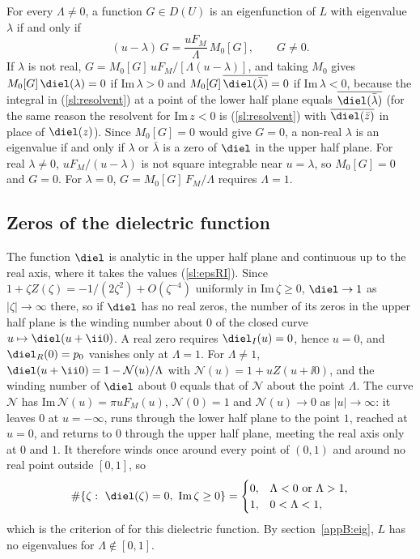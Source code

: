 For every $\Lambda\neq0$, a function $G\in D(U)$ is an eigenfunction of $L$ with eigenvalue $\lambda$ if and only if
\begin{equation*}
  (u-\lambda)\,G=\frac{uF_M}{\Lambda}\,M_0[G],\qquad G\neq0 .
\end{equation*}
If $\lambda$ is not real, $G=M_0[G]\,uF_M/[\Lambda(u-\lambda)]$, and taking $M_0$ gives $M_0[G]\,\diel(\lambda)=0$ if $\mathrm{Im}\,\lambda>0$ and $M_0[G]\,\overline{\diel(\bar\lambda)}=0$ if $\mathrm{Im}\,\lambda<0$, because the integral in (\ref{sl:resolvent}) at a point of the lower half plane equals $\overline{\diel(\bar\lambda)}$ (for the same reason the resolvent for $\mathrm{Im}\,z<0$ is (\ref{sl:resolvent}) with $\overline{\diel(\bar z)}$ in place of $\diel(z)$). Since $M_0[G]=0$ would give $G=0$, a non-real $\lambda$ is an eigenvalue if and only if $\lambda$ or $\bar\lambda$ is a zero of $\diel$ in the upper half plane. For real $\lambda\neq0$, $uF_M/(u-\lambda)$ is not square integrable near $u=\lambda$, so $M_0[G]=0$ and $G=0$. For $\lambda=0$, $G=M_0[G]\,F_M/\Lambda$ requires $\Lambda=1$.

\subsection{Zeros of the dielectric function}\label{appB:penrose}

The function $\diel$ is analytic in the upper half plane and continuous up to the real axis, where it takes the values (\ref{sl:epsRI}). Since $1+\zeta Z(\zeta)=-1/(2\zeta^2)+O(\zeta^{-4})$ uniformly in $\mathrm{Im}\,\zeta\ge0$, $\diel\to1$ as $|\zeta|\to\infty$ there, so if $\diel$ has no real zeros, the number of its zeros in the upper half plane is the winding number about $0$ of the closed curve $u\mapsto\diel(u+\ii0)$. A real zero requires $\diel_I(u)=0$, hence $u=0$, and $\diel_R(0)=p_0$ vanishes only at $\Lambda=1$. For $\Lambda\neq1$, $\diel(u+\ii0)=1-\mathcal N(u)/\Lambda$ with $\mathcal N(u)=1+uZ(u+\ii0)$, and the winding number of $\diel$ about $0$ equals that of $\mathcal N$ about the point $\Lambda$. The curve $\mathcal N$ has $\mathrm{Im}\,\mathcal N(u)=\pi uF_M(u)$, $\mathcal N(0)=1$ and $\mathcal N(u)\to0$ as $|u|\to\infty$: it leaves $0$ at $u=-\infty$, runs through the lower half plane to the point $1$, reached at $u=0$, and returns to $0$ through the upper half plane, meeting the real axis only at $0$ and $1$. It therefore winds once around every point of $(0,1)$ and around no real point outside $[0,1]$, so
\begin{equation}\label{appB:count}
  \#\{\zeta:\ \diel(\zeta)=0,\ \mathrm{Im}\,\zeta\ge0\}=
  \begin{cases}0, & \Lambda<0\ \text{or}\ \Lambda>1,\\ 1, & 0<\Lambda<1,\end{cases}
\end{equation}
which is the criterion of \citet{Penrose1960} for this dielectric function. By section~\ref{appB:eig}, $L$ has no eigenvalues for $\Lambda\notin[0,1]$.


